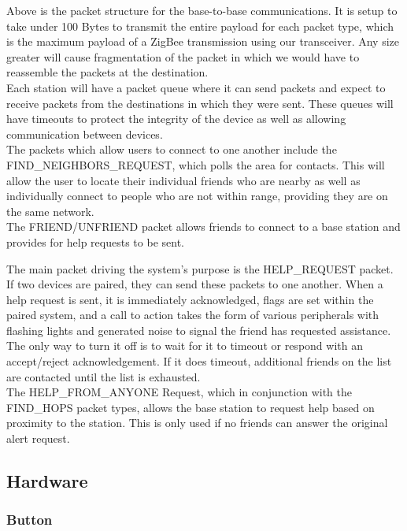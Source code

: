 \documentclass[journal,compsoc]{IEEEtran}
\begin{document}
\noindent Above is the packet structure for the base-to-base communications.  It is setup to take under 100 Bytes to transmit the entire payload for each packet type, which is the maximum payload of a ZigBee transmission using our transceiver.  Any size greater will cause fragmentation of the packet in which we would have to reassemble the packets at the destination.\\

\noindent Each station will have a packet queue where it can send packets and expect to receive packets from the destinations in which they were sent.  These queues will have timeouts to protect the integrity of the device as well as allowing communication between devices.\\

\noindent The packets which allow users to connect to one another include the FIND\_NEIGHBORS\_REQUEST, which polls the area for contacts.  This will allow the user to locate their individual friends who are nearby as well as individually connect to people who are not within range, providing they are on the same network.\\

\noindent The FRIEND/UNFRIEND packet allows friends to connect to a base station and provides for help requests to be sent.

\noindent The main packet driving the system's purpose is the HELP\_REQUEST packet.  If two devices are paired, they can send these packets to one another.  When a help request is sent, it is immediately acknowledged, flags are set within the paired system, and a call to action takes the form of various peripherals with flashing lights and generated noise to signal the friend has requested assistance.  The only way to turn it off is to wait for it to timeout or respond with an accept/reject acknowledgement.  If it does timeout, additional friends on the list are contacted until the list is exhausted.\\

\noindent The HELP\_FROM\_ANYONE Request, which in conjunction with the FIND\_HOPS packet types, allows the base station to request help based on proximity to the station.  This is only used if no friends can answer the original alert request.

\subsection{Hardware}

\subsubsection{Button}
\end{document}
